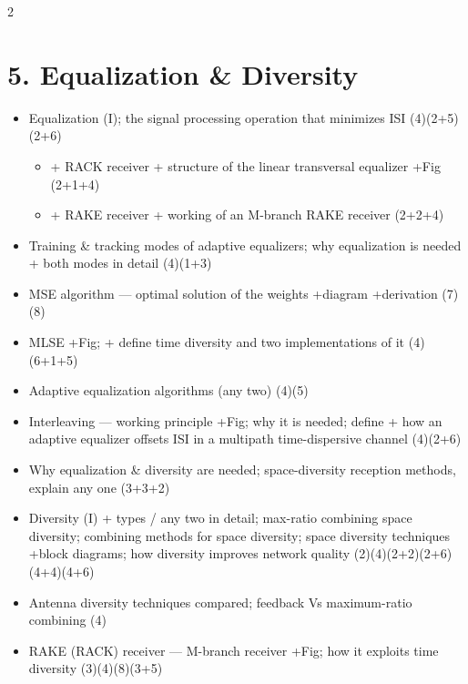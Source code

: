\documentclass[10pt]{article}
\begin{document}
\begin{multicols}{2}
\section*{5. Equalization \& Diversity}
\begin{itemize}
  \item Equalization (I); the signal processing operation that minimizes ISI \hfill (4)(2+5)(2+6)
    \begin{itemize}
      \item + RACK receiver + structure of the linear transversal equalizer +Fig \hfill (2+1+4)
      \item + RAKE receiver + working of an M-branch RAKE receiver \hfill (2+2+4)
    \end{itemize}
  \item Training \& tracking modes of adaptive equalizers; why equalization is needed + both modes in detail \hfill (4)(1+3)
  \item MSE algorithm --- optimal solution of the weights +diagram +derivation \hfill (7)(8)
  \item MLSE +Fig; + define time diversity and two implementations of it \hfill (4)(6+1+5)
  \item Adaptive equalization algorithms (any two) \hfill (4)(5)
  \item Interleaving --- working principle +Fig; why it is needed; define + how an adaptive equalizer offsets ISI in a multipath time-dispersive channel \hfill (4)(2+6)
  \item Why equalization \& diversity are needed; space-diversity reception methods, explain any one \hfill (3+3+2)
  \item Diversity (I) + types / any two in detail; max-ratio combining space diversity; combining methods for space diversity; space diversity techniques +block diagrams; how diversity improves network quality \hfill (2)(4)(2+2)(2+6)(4+4)(4+6)
  \item Antenna diversity techniques compared; feedback Vs maximum-ratio combining \hfill (4)
  \item RAKE (RACK) receiver --- M-branch receiver +Fig; how it exploits time diversity \hfill (3)(4)(8)(3+5)
\end{itemize}


\end{multicols}
\end{document}
